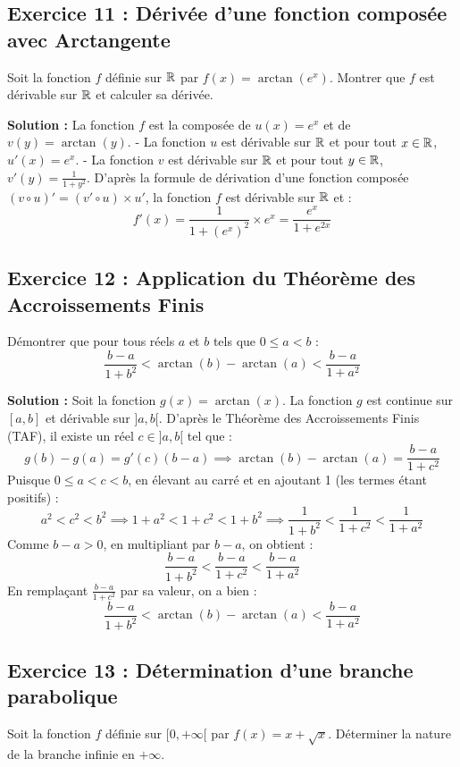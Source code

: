 \subsection*{Exercice 11 : Dérivée d'une fonction composée avec Arctangente}
Soit la fonction $f$ définie sur $\mathbb{R}$ par $f(x) = \arctan(e^x)$. Montrer que $f$ est dérivable sur $\mathbb{R}$ et calculer sa dérivée.

\textbf{Solution :}
La fonction $f$ est la composée de $u(x) = e^x$ et de $v(y) = \arctan(y)$.
- La fonction $u$ est dérivable sur $\mathbb{R}$ et pour tout $x \in \mathbb{R}$, $u'(x) = e^x$.
- La fonction $v$ est dérivable sur $\mathbb{R}$ et pour tout $y \in \mathbb{R}$, $v'(y) = \frac{1}{1+y^2}$.
D'après la formule de dérivation d'une fonction composée $(v \circ u)' = (v' \circ u) \times u'$, la fonction $f$ est dérivable sur $\mathbb{R}$ et :
\[
f'(x) = \frac{1}{1+(e^x)^2} \times e^x = \frac{e^x}{1+e^{2x}}
\]

\subsection*{Exercice 12 : Application du Théorème des Accroissements Finis}
Démontrer que pour tous réels $a$ et $b$ tels que $0 \le a < b$ :
\[
\frac{b-a}{1+b^2} < \arctan(b) - \arctan(a) < \frac{b-a}{1+a^2}
\]

\textbf{Solution :}
Soit la fonction $g(x) = \arctan(x)$. La fonction $g$ est continue sur $[a, b]$ et dérivable sur $]a, b[$.
D'après le Théorème des Accroissements Finis (TAF), il existe un réel $c \in ]a, b[$ tel que :
\[
g(b) - g(a) = g'(c)(b-a) \implies \arctan(b) - \arctan(a) = \frac{b-a}{1+c^2}
\]
Puisque $0 \le a < c < b$, en élevant au carré et en ajoutant 1 (les termes étant positifs) :
\[
a^2 < c^2 < b^2 \implies 1+a^2 < 1+c^2 < 1+b^2 \implies \frac{1}{1+b^2} < \frac{1}{1+c^2} < \frac{1}{1+a^2}
\]
Comme $b-a > 0$, en multipliant par $b-a$, on obtient :
\[
\frac{b-a}{1+b^2} < \frac{b-a}{1+c^2} < \frac{b-a}{1+a^2}
\]
En remplaçant $\frac{b-a}{1+c^2}$ par sa valeur, on a bien :
\[
\frac{b-a}{1+b^2} < \arctan(b) - \arctan(a) < \frac{b-a}{1+a^2}
\]

\subsection*{Exercice 13 : Détermination d'une branche parabolique}
Soit la fonction $f$ définie sur $[0, +\infty[$ par $f(x) = x + \sqrt{x}$. Déterminer la nature de la branche infinie en $+\infty$.


